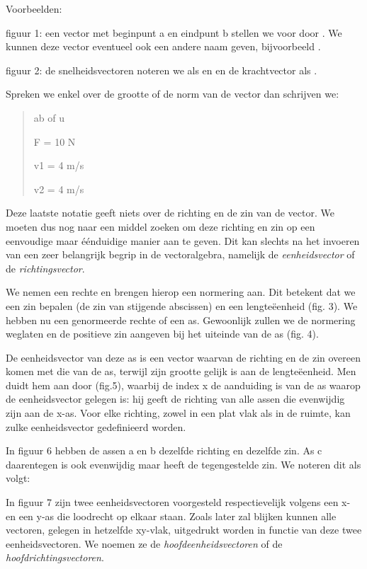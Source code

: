 \documentclass[]{article}
\begin{document}
Voorbeelden:

figuur 1: een vector met beginpunt a en eindpunt b stellen we voor door
. We kunnen deze vector eventueel ook een andere naam geven,
bijvoorbeeld .

figuur 2: de snelheidsvectoren noteren we als en en de krachtvector als
.

Spreken we enkel over de grootte of de norm van de vector dan schrijven
we:

\begin{quote}
ab of u

F = 10 N

v1 = 4 m/s

v2 = 4 m/s
\end{quote}

Deze laatste notatie geeft niets over de richting en de zin van de
vector. We moeten dus nog naar een middel zoeken om deze richting en zin
op een eenvoudige maar éénduidige manier aan te geven. Dit kan slechts
na het invoeren van een zeer belangrijk begrip in de vectoralgebra,
namelijk de \emph{eenheidsvector} of de \emph{richtingsvector}.

We nemen een rechte en brengen hierop een normering aan. Dit betekent
dat we een zin bepalen (de zin van stijgende abscissen) en een
lengteëenheid (fig. 3). We hebben nu een genormeerde rechte of een as.
Gewoonlijk zullen we de normering weglaten en de positieve zin aangeven
bij het uiteinde van de as (fig. 4).

De eenheidsvector van deze as is een vector waarvan de richting en de
zin overeen komen met die van de as, terwijl zijn grootte gelijk is aan
de lengteëenheid. Men duidt hem aan door (fig.5), waarbij de index x de
aanduiding is van de as waarop de eenheidsvector gelegen is: hij geeft
de richting van alle assen die evenwijdig zijn aan de x-as. Voor elke
richting, zowel in een plat vlak als in de ruimte, kan zulke
eenheidsvector gedefinieerd worden.

In figuur 6 hebben de assen a en b dezelfde richting en dezelfde zin. As
c daarentegen is ook evenwijdig maar heeft de tegengestelde zin. We
noteren dit als volgt:

In figuur 7 zijn twee eenheidsvectoren voorgesteld respectievelijk
volgens een x- en een y-as die loodrecht op elkaar staan. Zoals later
zal blijken kunnen alle vectoren, gelegen in hetzelfde xy-vlak,
uitgedrukt worden in functie van deze twee eenheidsvectoren. We noemen
ze de \emph{hoofdeenheidsvectoren} of de \emph{hoofdrichtingsvectoren}.
\end{document}
